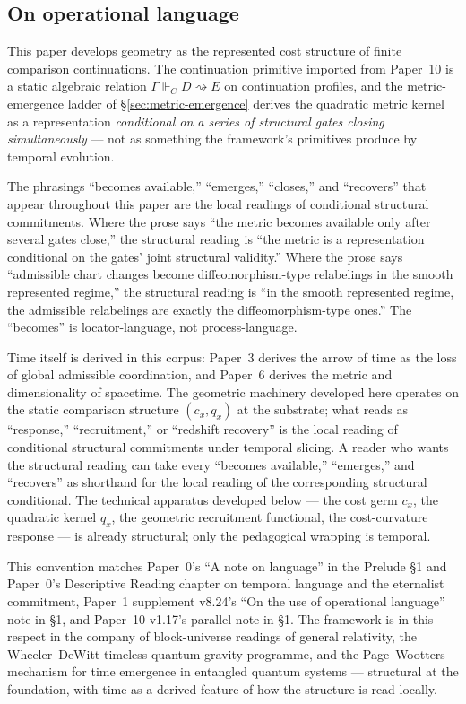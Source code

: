 \documentclass[11pt]{article}
\theoremstyle{remark}
\newcommand{\G}{\Gamma}
\newcommand{\entails}{\Vdash}
\newcommand{\goes}{\rightsquigarrow}
\begin{document}
\subsection*{On operational language}

This paper develops geometry as the represented cost structure of finite comparison continuations.  The continuation primitive imported from Paper~10 is a static algebraic relation $\G\entails_C D\goes E$ on continuation profiles, and the metric-emergence ladder of \S\ref{sec:metric-emergence} derives the quadratic metric kernel as a representation \emph{conditional on a series of structural gates closing simultaneously} --- not as something the framework's primitives produce by temporal evolution.

The phrasings ``becomes available,'' ``emerges,'' ``closes,'' and ``recovers'' that appear throughout this paper are the local readings of conditional structural commitments.  Where the prose says ``the metric becomes available only after several gates close,'' the structural reading is ``the metric is a representation conditional on the gates' joint structural validity.''  Where the prose says ``admissible chart changes become diffeomorphism-type relabelings in the smooth represented regime,'' the structural reading is ``in the smooth represented regime, the admissible relabelings are exactly the diffeomorphism-type ones.''  The ``becomes'' is locator-language, not process-language.

Time itself is derived in this corpus: Paper~3 derives the arrow of time as the loss of global admissible coordination, and Paper~6 derives the metric and dimensionality of spacetime.  The geometric machinery developed here operates on the static comparison structure $(c_x, q_x)$ at the substrate; what reads as ``response,'' ``recruitment,'' or ``redshift recovery'' is the local reading of conditional structural commitments under temporal slicing.  A reader who wants the structural reading can take every ``becomes available,'' ``emerges,'' and ``recovers'' as shorthand for the local reading of the corresponding structural conditional.  The technical apparatus developed below --- the cost germ $c_x$, the quadratic kernel $q_x$, the geometric recruitment functional, the cost-curvature response --- is already structural; only the pedagogical wrapping is temporal.

This convention matches Paper~0's ``A note on language'' in the Prelude \S1 and Paper~0's Descriptive Reading chapter on temporal language and the eternalist commitment, Paper~1 supplement v8.24's ``On the use of operational language'' note in \S1, and Paper~10 v1.17's parallel note in \S1.  The framework is in this respect in the company of block-universe readings of general relativity, the Wheeler--DeWitt timeless quantum gravity programme, and the Page--Wootters mechanism for time emergence in entangled quantum systems --- structural at the foundation, with time as a derived feature of how the structure is read locally.
\end{document}

